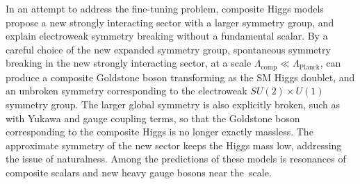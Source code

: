 In an attempt to address the fine-tuning problem, composite Higgs models~\cite{comp_higgs_1,comp_higgs_2} propose a new strongly interacting sector with a larger symmetry group, and explain electroweak symmetry breaking without a fundamental scalar. By a careful choice of the new expanded symmetry group, spontaneous symmetry breaking in the new strongly interacting sector, at a scale $\Lambda_{\text{comp}}\ll \Lambda_{\text{Planck}}$, can produce a composite Goldstone boson transforming as the SM Higgs doublet, and an unbroken symmetry corresponding to the electroweak $SU(2)\times U(1)$ symmetry group. The larger global symmetry is also explicitly broken, such as with Yukawa and gauge coupling terms, so that the Goldstone boson corresponding to the composite Higgs is no longer exactly massless.
The approximate symmetry of the new sector keeps the Higgs mass low, addressing the issue of naturalness.  Among the predictions of these models is resonances of composite scalars and new heavy gauge bosons near the \TeV\,scale.  

